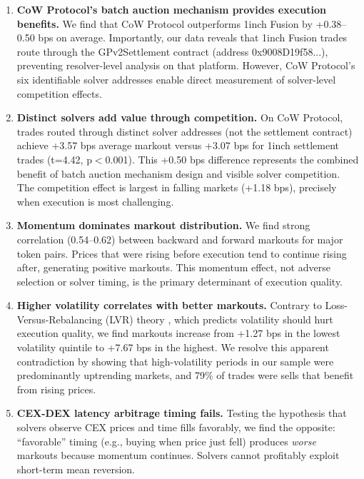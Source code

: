 \documentclass[12pt,a4paper]{article}
\begin{document}
\begin{enumerate}[leftmargin=*]
    \item \textbf{CoW Protocol's batch auction mechanism provides execution benefits.} We find that CoW Protocol outperforms 1inch Fusion by +0.38--0.50 bps on average. Importantly, our data reveals that 1inch Fusion trades route through the GPv2Settlement contract (address 0x9008D19f58...), preventing resolver-level analysis on that platform. However, CoW Protocol's six identifiable solver addresses enable direct measurement of solver-level competition effects.

    \item \textbf{Distinct solvers add value through competition.} On CoW Protocol, trades routed through distinct solver addresses (not the settlement contract) achieve +3.57 bps average markout versus +3.07 bps for 1inch settlement trades (t=4.42, p$<$0.001). This +0.50 bps difference represents the combined benefit of batch auction mechanism design and visible solver competition. The competition effect is largest in falling markets (+1.18 bps), precisely when execution is most challenging.

    \item \textbf{Momentum dominates markout distribution.} We find strong correlation (0.54--0.62) between backward and forward markouts for major token pairs. Prices that were rising before execution tend to continue rising after, generating positive markouts. This momentum effect, not adverse selection or solver timing, is the primary determinant of execution quality.

    \item \textbf{Higher volatility correlates with better markouts.} Contrary to Loss-Versus-Rebalancing (LVR) theory \citep{milionis2022}, which predicts volatility should hurt execution quality, we find markouts increase from +1.27 bps in the lowest volatility quintile to +7.67 bps in the highest. We resolve this apparent contradiction by showing that high-volatility periods in our sample were predominantly uptrending markets, and 79\% of trades were sells that benefit from rising prices.

    \item \textbf{CEX-DEX latency arbitrage timing fails.} Testing the hypothesis that solvers observe CEX prices and time fills favorably, we find the opposite: ``favorable'' timing (e.g., buying when price just fell) produces \textit{worse} markouts because momentum continues. Solvers cannot profitably exploit short-term mean reversion.
\end{enumerate}
\end{document}
